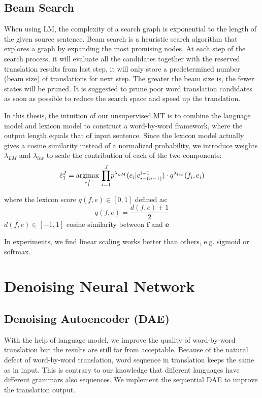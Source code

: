 	\subsection{Beam Search}
	When using LM, the complexity of a search graph is exponential to the length of the given source sentence. Beam search is a heuristic search algorithm that explores a graph by expanding the most promising nodes. At each step of the search process, it will evaluate all the candidates together with the reserved translation results from last step, it will only store a predetermined number (beam size) of translations for next step. The greater the beam size is, the fewer states will be pruned. 	
	It is suggested to prune poor word translation candidates as soon as possible to reduce the search space and speed up the translation. 
	
	In this thesis, the intuition of our unsupervised MT is to combine the language model and lexicon model to construct a word-by-word framework, where the output length equals that of input sentence. Since the lexicon model actually gives a cosine similarity instead of a normalized probability, we introduce weights $\lambda_{LM}$ and $\lambda_{lex}$ to scale the contribution of each of the two components:
	\[ \hat{e}_1^J = \underset{e_1^J}{\operatorname{argmax}}{\ \prod_{i=1}^{J}} {p^{\lambda_{LM}}(e_i|e_{i-(n-1)}^{i-1}) \cdot q^{\lambda_{lex}}(f_i,e_i)}\]

 	where the lexicon score ${q(f,e) \in [0,1]}$ defined as:
 	\[q(f,e) = \frac{d(f,e)+1}{2} \]
 	${d(f,e)\in [-1,1]}$ cosine similarity between $\bm{f}$ and $\bm{e}$
	
	
	In experiments, we find linear scaling works better than others, e.g. sigmoid or softmax.
	
\section{Denoising Neural Network}
\subsection{Denoising Autoencoder (DAE)}
	With the help of language model, we improve the quality of word-by-word translation but the results are still far from acceptable. Because of the natural defect of word-by-word translation, word sequence in translation keeps the same as in input. This is contrary to our knowledge that different languages have different grammars also sequences. We implement the sequential DAE to improve the translation output.
	
